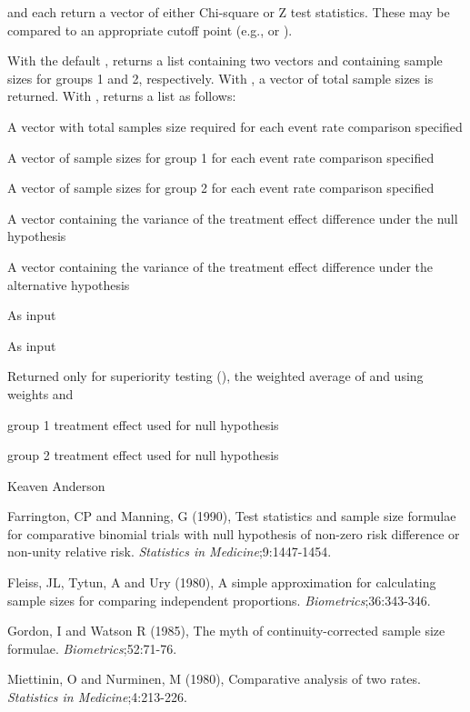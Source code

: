 \begin{Value}
 and  each return a vector of either Chi-square or Z test statistics. 
These may be compared to an appropriate cutoff point (e.g.,  or ).

With the default ,  returns a list containing two vectors  and  containing
sample sizes for groups 1 and 2, respectively.
With , a vector of total sample sizes is returned.
With ,  returns a list as follows:
\begin{ldescription}
\item[\code{n}] A vector with total samples size required for each event rate comparison specified
\item[\code{n1}] A vector of sample sizes for group 1 for each event rate comparison specified
\item[\code{n2}] A vector of sample sizes for group 2 for each event rate comparison specified
\item[\code{sigma0}] A vector containing the variance of the treatment effect difference under the null hypothesis
\item[\code{sigma1}] A vector containing the variance of the treatment effect difference under the alternative hypothesis
\item[\code{p1}] As input
\item[\code{p2}] As input
\item[\code{pbar}] Returned only for superiority testing (), the weighted average of  and  using weights
 and 
\item[\code{p10}] group 1 treatment effect used for null hypothesis
\item[\code{p20}] group 2 treatment effect used for null hypothesis
\end{ldescription}
\end{Value}
\begin{Author}\relax
Keaven Anderson 
\end{Author}
\begin{References}\relax
Farrington, CP and Manning, G (1990), Test statistics and sample size formulae for comparative binomial trials with null hypothesis
of non-zero risk difference or non-unity relative risk. \emph{Statistics in Medicine};9:1447-1454.

Fleiss, JL, Tytun, A and Ury (1980), A simple approximation for calculating sample sizes for comparing independent proportions.
\emph{Biometrics};36:343-346.

Gordon, I and Watson R (1985), The myth of continuity-corrected sample size formulae. \emph{Biometrics};52:71-76.

Miettinin, O and Nurminen, M (1980), Comparative analysis of two rates. \emph{Statistics in Medicine};4:213-226.
\end{References}
